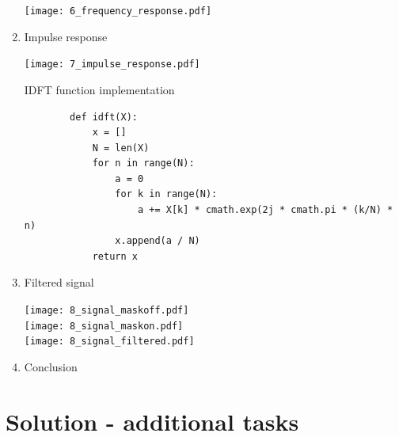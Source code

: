 \documentclass[a4paper, 11pt]{article}
\begin{document}
\begin{enumerate}
        \texttt{[image: 6\_frequency\_response.pdf]}

        \item
        Impulse response

        \texttt{[image: 7\_impulse\_response.pdf]}

        IDFT function implementation

        \begin{verbatim}
        def idft(X):
            x = []
            N = len(X)
            for n in range(N):
                a = 0
                for k in range(N):
                    a += X[k] * cmath.exp(2j * cmath.pi * (k/N) * n)
                x.append(a / N)
            return x
        \end{verbatim}

        \newpage

        \item
        Filtered signal

        \texttt{[image: 8\_signal\_maskoff.pdf]} \\
        \texttt{[image: 8\_signal\_maskon.pdf]} \\
        \texttt{[image: 8\_signal\_filtered.pdf]}

        \item
        Conclusion

    \end{enumerate}

    \newpage
    \section*{Solution - additional tasks}
\end{document}
